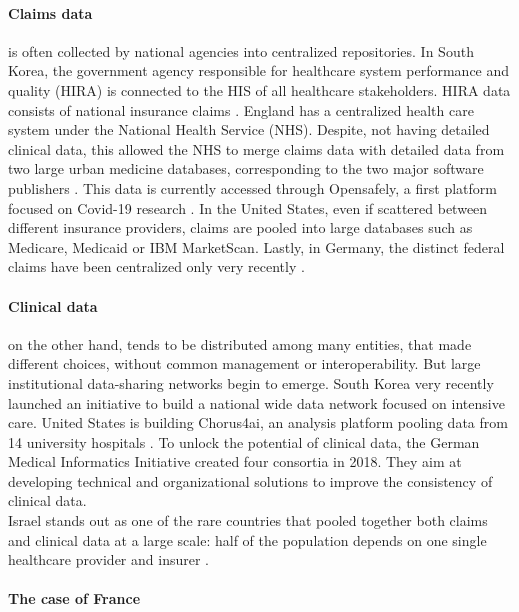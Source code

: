 \documentclass[french,12pt,twoside,a4paper]{book}
\begin{document}
\paragraph{Claims data} is often collected by national agencies into centralized
repositories. In South Korea, the government agency responsible for healthcare
system performance and quality (HIRA) is connected to the HIS of all healthcare
stakeholders. HIRA data consists of national insurance claims
\cite{kyoung2022understanding}. England has a centralized health care system
under the National Health Service (NHS). Despite, not having detailed clinical
data, this allowed the NHS to merge claims data with detailed data from two
large urban medicine databases, corresponding to the two major software
publishers \cite{opensafely_system_one_data_2023}. This data is currently
accessed through Opensafely, a first platform focused on Covid-19 research
\cite{opensafely_2022}. In the United States, even if scattered between different
insurance providers, claims are pooled into large databases such as
Medicare, Medicaid or IBM MarketScan. Lastly, in Germany, the distinct federal
claims have been centralized only very recently \cite{kreis2016status}.

\paragraph{Clinical data} on the other hand, tends to be distributed among many
entities, that made different choices, without common management or
interoperability. But large institutional data-sharing networks begin to emerge.
South Korea very recently launched an initiative to build a national wide data
network focused on intensive care. United States is building Chorus4ai, an
analysis platform pooling data from 14 university hospitals
\cite{chorus4ai_2023}. To unlock the potential of clinical data, the German
Medical Informatics Initiative \cite{gehring_german_2018} created four consortia
in 2018. They aim at developing technical and organizational solutions to
improve the consistency of clinical data.\\

Israel stands out as one of the rare countries that pooled together both claims
and clinical data at a large scale: half of the population depends on one single
healthcare provider and insurer \cite{clalit_data_2023}.

\paragraph{The case of France}
\end{document}
